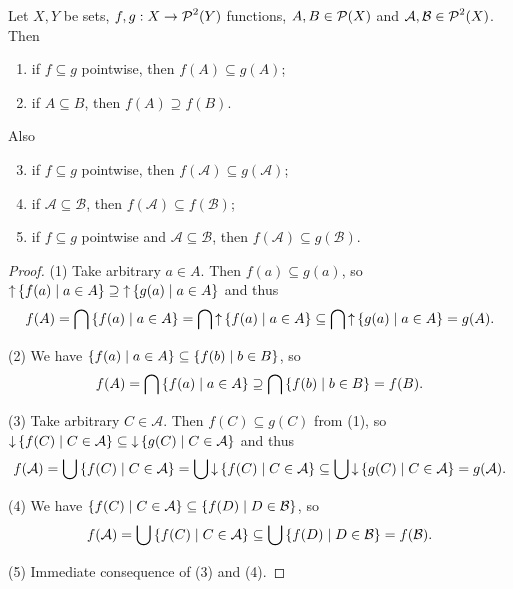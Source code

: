 \begin{lemma} \label{inclusionPreservantionOfContours}
Let $X,Y$ be sets, $f,g: X\to \operatorname{\mathcal{P}}^2(Y)$ functions, $A,B\in\operatorname{\mathcal{P}}(X)$ and $\mathcal{A}, \mathcal{B}\in\operatorname{\mathcal{P}}^2(X)$. Then
\begin{enumerate}
\item if $f \subseteq g$ pointwise, then $f(A) \subseteq g(A)$;
\item if $A \subseteq B$, then $f(A) \supseteq f(B)$.
\end{enumerate}
Also
\begin{enumerate} \setcounter{enumi}{2}
\item if $f \subseteq g$ pointwise, then $f(\mathcal{A}) \subseteq g(\mathcal{A})$;
\item if $\mathcal{A} \subseteq \mathcal{B}$, then $f(\mathcal{A}) \subseteq f(\mathcal{B})$;
\item if $f \subseteq g$ pointwise and $\mathcal{A} \subseteq \mathcal{B}$, then $f(\mathcal{A}) \subseteq g(\mathcal{B})$.
\end{enumerate}
\end{lemma}
\begin{proof}
(1) Take arbitrary $a\in A$. Then $f(a) \subseteq g(a)$, so $\upset\setbuilder{f(a)}{a\in A} \supseteq \upset\setbuilder{g(a)}{a\in A}$ and thus
\[ f(A) = \bigcap\setbuilder{f(a)}{a\in A} = \bigcap\upset\setbuilder{f(a)}{a\in A} \subseteq \bigcap\upset\setbuilder{g(a)}{a\in A} = g(A). \]

(2) We have $\setbuilder{f(a)}{a\in A} \subseteq \setbuilder{f(b)}{b\in B}$, so
\[ f(A) = \bigcap\setbuilder{f(a)}{a\in A} \supseteq \bigcap\setbuilder{f(b)}{b\in B} = f(B). \]

(3) Take arbitrary $C\in \mathcal{A}$. Then $f(C) \subseteq g(C)$ from (1), so $\downset\setbuilder{f(C)}{C\in \mathcal{A}} \subseteq \downset\setbuilder{g(C)}{C\in \mathcal{A}}$ and thus
\[ f(\mathcal{A}) = \bigcup\setbuilder{f(C)}{C\in \mathcal{A}} = \bigcup\downset\setbuilder{f(C)}{C\in \mathcal{A}} \subseteq \bigcup\downset\setbuilder{g(C)}{C\in \mathcal{A}} = g(\mathcal{A}). \]

(4) We have $\setbuilder{f(C)}{C\in \mathcal{A}} \subseteq \setbuilder{f(D)}{D\in \mathcal{B}}$, so
\[ f(\mathcal{A}) = \bigcup\setbuilder{f(C)}{C\in \mathcal{A}} \subseteq \bigcup\setbuilder{f(D)}{D\in \mathcal{B}} = f(\mathcal{B}). \]

(5) Immediate consequence of (3) and (4).
\end{proof}

